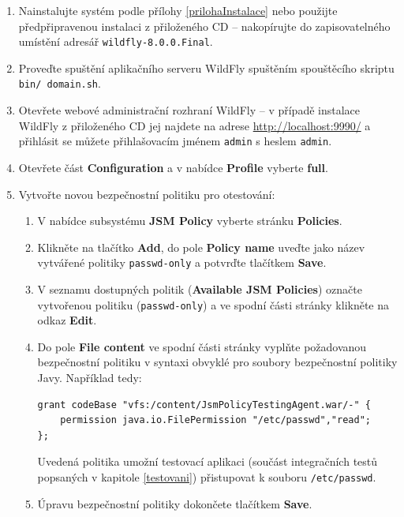 \begin{enumerate}
  
  \item Nainstalujte systém podle přílohy \ref{prilohaInstalace} nebo použijte předpřipravenou instalaci z přiloženého CD -- nakopírujte do zapisovatelného umístění adresář {\tt wildfly-8.0.0.Final}.
  \item Proveďte spuštění aplikačního serveru WildFly spuštěním spouštěcího skriptu {\tt bin/ domain.sh}.
  \item Otevřete webové administrační rozhraní WildFly -- v případě instalace WildFly z přiloženého CD jej najdete na adrese \url{http://localhost:9990/} a přihlásit se můžete přihlašovacím jménem {\tt admin} s heslem {\tt admin}.
  \item Otevřete část {\bf Configuration} a v nabídce {\bf Profile} vyberte {\bf full}.
  
  \item Vytvořte novou bezpečnostní politiku pro otestování:
  \begin{enumerate}
    \item V nabídce subsystému {\bf JSM Policy} vyberte stránku {\bf Policies}.
    \item Klikněte na tlačítko {\bf Add}, do pole {\bf Policy name} uveďte jako název vytvářené politiky {\tt passwd-only} a potvrďte tlačítkem {\bf Save}.
    \item V seznamu dostupných politik ({\bf Available JSM Policies}) označte vytvořenou politiku ({\tt passwd-only}) a ve spodní části stránky klikněte na odkaz {\bf Edit}.
    \item Do pole {\bf File content} ve spodní části stránky vyplňte požadovanou bezpečnostní politiku v syntaxi obvyklé pro soubory bezpečnostní politiky Javy. Například tedy:
    \begin{lstlisting}
grant codeBase "vfs:/content/JsmPolicyTestingAgent.war/-" {
    permission java.io.FilePermission "/etc/passwd","read";
};
    \end{lstlisting}
    Uvedená politika umožní testovací aplikaci (součást integračních testů popsaných v kapitole \ref{testovani}) přistupovat k souboru {\tt /etc/passwd}.
    \item Úpravu bezpečnostní politiky dokončete tlačítkem {\bf Save}.
  \end{enumerate}
  

\end{enumerate}
